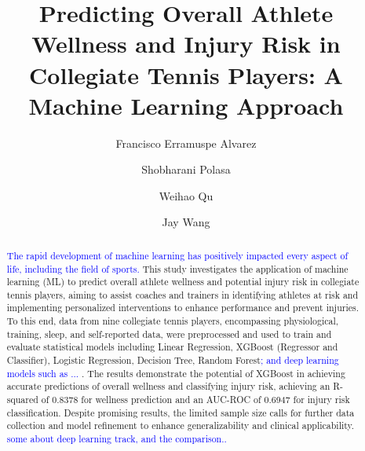 \documentclass[manuscript,acmsmall,review,screen,authorversion=true]{acmart}
\begin{document}
\title{\small Predicting Overall Athlete Wellness and Injury Risk in Collegiate Tennis Players: A Machine Learning Approach}

\author{Francisco Erramuspe Alvarez}
\author{Shobharani Polasa}
\author{Weihao Qu}
\author{Jay Wang}

\newcommand{\wq}[1]{\textcolor{blue}{#1}}

\renewcommand{\shortauthors}{Erramuspe Alvarez et al.}

\begin{abstract}
\wq{The rapid development of machine learning has positively impacted every aspect of life, including the field of sports. }
This study investigates the application of machine learning (ML) to predict overall athlete wellness and potential injury risk in collegiate tennis players, aiming to assist coaches and trainers in identifying athletes at risk and implementing personalized interventions to enhance performance and prevent injuries. 
To this end, 
data from nine collegiate tennis players, encompassing physiological, training, sleep, and self-reported data, were preprocessed and used to train and evaluate statistical models including Linear Regression, XGBoost (Regressor and Classifier), Logistic Regression, Decision Tree, Random Forest\wq{; and deep learning models such as ... }. The results demonstrate the potential of XGBoost in achieving accurate predictions of overall wellness and classifying injury risk, achieving an R-squared of 0.8378 for wellness prediction and an AUC-ROC of 0.6947 for injury risk classification. Despite promising results, the limited sample size calls for further data collection and model refinement to enhance generalizability and clinical applicability. \wq{some about deep learning track, and the comparison..}
\end{abstract}

\end{document}
